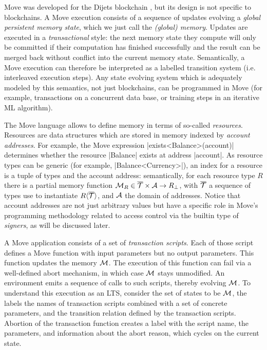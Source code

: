 
Move was developed for the Dijets blockchain \cite{DIJETS}, but its design is not
specific to blockchains.  A Move execution consists of a sequence of updates
evolving a \emph{global persistent memory state}, which we just call the
\emph{(global) memory}.  Updates are executed in a \emph{transactional} style:
the next memory state they compute will only be committed if their computation
has finished successfully and the result can be merged back without conflict
into the current memory state. Semantically, a Move execution can therefore be
interpreted as a labelled transition system (i.e. interleaved execution
steps). Any state evolving system which is adequately modeled by this semantics,
not just blockchains, can be programmed in Move (for example, transactions on a
concurrent data base, or training steps in an iterative ML algorithm).

The Move language allows to define memory in terms of so-called
\emph{resources}.  Resources are data structures which are stored in memory
indexed by \emph{account addresses}. For example, the Move expression
|exists<Balance>(account)| determines whether the resource |Balance| exists at
address |account|. As resource types can be generic (for example,
|Balance<Currency>|), an index for a resource is a tuple of types and the
account address: semantically, for each resource type $R$ there is a partial
memory function $\mathcal{M}_R \in \overline{\mathcal{T}} \times \mathcal{A} \rightarrow R_\bot$,
with $\overline{\mathcal{T}}$ a sequence of types use to instantiate
$R\langle\overline{\mathcal{T}}\rangle$, and $\mathcal{A}$ the domain of addresses. Notice that
account addresses are not just arbitrary values but have a specific role in
Move's programming methodology related to access control via the builtin type of
\emph{signers}, as will be discussed later.

A Move application consists of a set of \emph{transaction scripts}. Each of
those script defines a Move function with input parameters but no output
parameters.  This function updates the memory $\mathcal{M}$. The execution of this
function can fail via a well-defined abort mechanism, in which case $\mathcal{M}$
stays unmodified. An environment emits a sequence of calls to such scripts,
thereby evolving $\mathcal{M}$. To understand this execution as an LTS, consider the
set of states to be $\mathcal{M}$, the labels the names of transaction scripts
combined with a set of concrete parameters, and the transition relation defined
by the transaction scripts. Abortion of the transaction function creates a label
with the script name, the parameters, and information about the abort reason,
which cycles on the current state.


